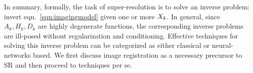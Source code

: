 In summary, formally, the task of super-resolution is to solve an inverse problem: invert eqn.~\eqref{eqn:imagingmodel} given one or more \(X_k\).
%
In general, since \(A_k, H_k, D_k\) are highly degenerate functions, the corresponding inverse problems are ill-posed without regularization and conditioning.
%
Effective techniques for solving this inverse problem can be categorized as either classical or neural-networks based. We first discuss image registration as a necessary precursor to SR and then proceed to techniques per se.